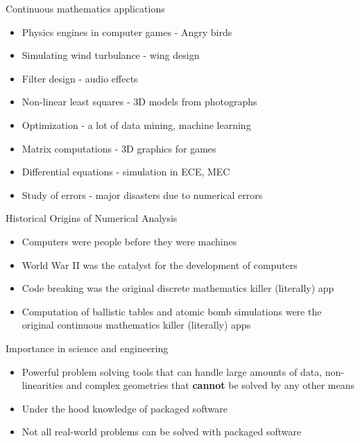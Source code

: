\documentclass[12pt]{beamer}
\begin{document}
\begin{frame}{Continuous mathematics applications} 
\begin{itemize} 
\item{Physics engines in computer games - Angry birds}
\item{Simulating wind turbulance - wing design}
\item{Filter design - audio effects} 
\item{Non-linear least squares - 3D models from photographs}
\item{Optimization - a lot of data mining, machine learning}
\item{Matrix computations - 3D graphics for games} 
\item{Differential equations - simulation in ECE, MEC}
\item{Study of errors - major disasters due to numerical errors} 
\end{itemize} 
\end{frame} 



\begin{frame}{Historical Origins of Numerical Analysis} 

\begin{itemize} 
\item{Computers were people before they were machines}
\item{World War II was the catalyst for the development of computers} 
\item{Code breaking was the original discrete mathematics killer (literally) 
app}
\item{Computation of ballistic tables and atomic bomb simulations were the 
original continuous mathematics killer (literally) apps}
\end{itemize} 

\end{frame} 


\begin{frame}{Importance in science and engineering} 
\begin{itemize}
\item{Powerful problem solving tools that can handle large amounts of data, non-linearities and complex geometries that {\bf cannot} be solved by any other means} 
\vspace{\baselineskip}
\item{Under the hood knowledge of packaged software} 
\vspace{\baselineskip}
\item{Not all real-world problems can be solved with packaged software} 
\end{itemize} 
\end{frame} 
\end{document}
